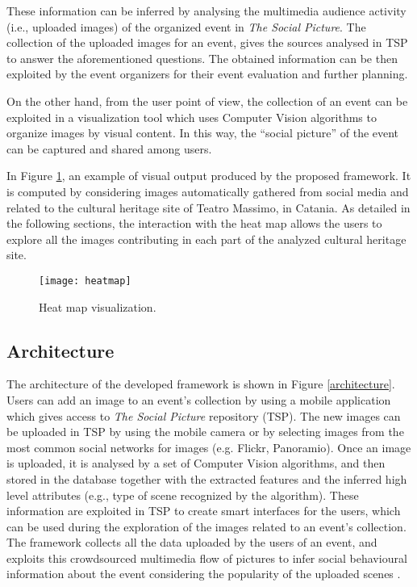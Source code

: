 These information can be inferred by analysing the multimedia audience activity (i.e., uploaded images) of the organized event in \textit{The Social Picture}. The collection of the uploaded images for an event, gives the sources analysed in TSP to answer the aforementioned questions. The obtained information can be then exploited by the event organizers for their event evaluation and further planning.

On the other hand, from the user point of view, the collection of an event can be exploited in a visualization tool which uses Computer Vision algorithms to organize images by visual content. In this way, the ``social picture'' of the event can be captured and shared among users.

In Figure \ref{heatmap}, an example of visual output produced by the proposed framework. It is computed by considering images automatically gathered from social media and related to the cultural heritage site of Teatro Massimo, in Catania. As detailed in the following sections, the interaction with the heat map allows the users to explore all the images contributing in each part of the analyzed cultural heritage site.
\begin{figure}
	\centering
	\texttt{[image: heatmap]}
	\caption{Heat map visualization.}
	\label{heatmap}
\end{figure}

\subsection{Architecture}
The architecture of the developed framework is shown in Figure \ref{architecture}.
Users can add an image to an event's collection by using a mobile application which gives access to \textit{The Social Picture} repository (TSP). The new images can be uploaded in TSP by using the mobile camera or by selecting images from the most common social networks for images (e.g. Flickr, Panoramio).
Once an image is uploaded, it is analysed by a set of Computer Vision algorithms, and then stored in the database together with the extracted features and the inferred high level attributes (e.g., type of scene recognized by the algorithm). These information are exploited in TSP to create smart interfaces for the users, which can be used during the exploration of the images related to an event's collection.
The framework collects all the data uploaded by the users of an event, and exploits this crowdsourced multimedia flow of pictures to infer social behavioural information about the event considering the popularity of the uploaded scenes \cite{Ortis2015n525}.

